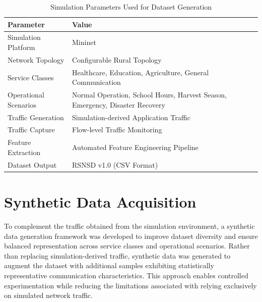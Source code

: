 \documentclass[12pt,a4paper]{report}
\begin{document}
	
	\begin{table}[H]
		\centering
		\caption{Simulation Parameters Used for Dataset Generation}
		\label{tab:simulation_parameters}
		
		\begin{tabular}{|p{5cm}|p{10cm}|}
			\hline
			
			\textbf{Parameter} &
			\textbf{Value}
			\\
			\hline
			
			Simulation Platform &
			Mininet
			\\
			\hline
			
			Network Topology &
			Configurable Rural Topology
			\\
			\hline
			
			Service Classes &
			Healthcare, Education, Agriculture, General Communication
			\\
			\hline
			
			Operational Scenarios &
			Normal Operation, School Hours, Harvest Season, Emergency, Disaster Recovery
			\\
			\hline
			
			Traffic Generation &
			Simulation-derived Application Traffic
			\\
			\hline
			
			Traffic Capture &
			Flow-level Traffic Monitoring
			\\
			\hline
			
			Feature Extraction &
			Automated Feature Engineering Pipeline
			\\
			\hline
			
			Dataset Output &
			RSNSD v1.0 (CSV Format)
			\\
			\hline
			
		\end{tabular}
		
	\end{table}
	
	\section{Synthetic Data Acquisition}
	\label{sec:synthetic_generation}
	
	To complement the traffic obtained from the simulation environment, a synthetic data generation framework was developed to improve dataset diversity and ensure balanced representation across service classes and operational scenarios. Rather than replacing simulation-derived traffic, synthetic data was generated to augment the dataset with additional samples exhibiting statistically representative communication characteristics. This approach enables controlled experimentation while reducing the limitations associated with relying exclusively on simulated network traffic.
	
\end{document}

